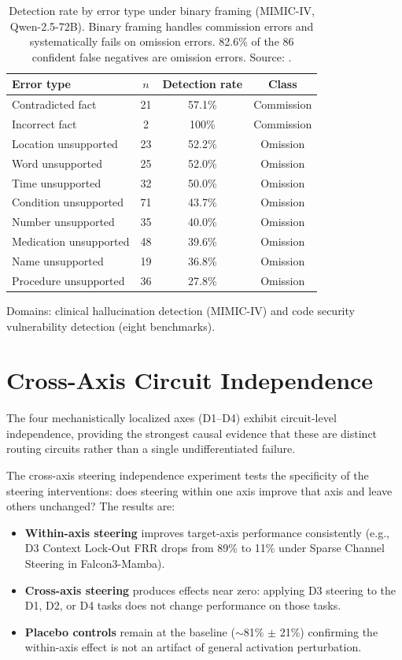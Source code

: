 \documentclass[11pt]{article}
\newcommand{\tighttable}{\setlength{\tabcolsep}{4pt}\renewcommand{\arraystretch}{1.05}}
\begin{document}
\begin{table}[H]
\centering\small\tighttable
\begin{tabular}{@{}lccc@{}}
\toprule
\textbf{Error type} & $n$ & \textbf{Detection rate} & \textbf{Class} \\
\midrule
Contradicted fact & 21 & 57.1\% & Commission \\
Incorrect fact & 2 & 100\% & Commission \\
\midrule
Location unsupported & 23 & 52.2\% & Omission \\
Word unsupported & 25 & 52.0\% & Omission \\
Time unsupported & 32 & 50.0\% & Omission \\
Condition unsupported & 71 & 43.7\% & Omission \\
Number unsupported & 35 & 40.0\% & Omission \\
Medication unsupported & 48 & 39.6\% & Omission \\
Name unsupported & 19 & 36.8\% & Omission \\
Procedure unsupported & 36 & 27.8\% & Omission \\
\bottomrule
\end{tabular}
\caption{Detection rate by error type under binary framing (MIMIC-IV,
Qwen-2.5-72B). Binary framing handles commission errors and
systematically fails on omission errors. 82.6\% of the 86 confident
false negatives are omission errors. Source: \citep{tower2026detection}.}
\label{tab:types}
\end{table}

Domains: clinical hallucination detection (MIMIC-IV) and code security
vulnerability detection (eight benchmarks).

\section{Cross-Axis Circuit Independence}
\label{sec:independence}

The four mechanistically localized axes (D1--D4) exhibit circuit-level
independence, providing the strongest causal evidence that these are
distinct routing circuits rather than a single undifferentiated failure.

The cross-axis steering independence experiment tests the specificity of
the steering interventions: does steering within one axis improve that
axis and leave others unchanged? The results are:

\begin{itemize}[noitemsep, topsep=2pt]
\item \textbf{Within-axis steering} improves target-axis performance
consistently (e.g., D3 Context Lock-Out FRR drops from 89\% to 11\%
under Sparse Channel Steering in Falcon3-Mamba).
\item \textbf{Cross-axis steering} produces effects near zero: applying
D3 steering to the D1, D2, or D4 tasks does not change performance on
those tasks.
\item \textbf{Placebo controls} remain at the baseline ($\sim$81\%
$\pm$ 21\%) confirming the within-axis effect is not an artifact of
general activation perturbation.
\end{itemize}
\end{document}
